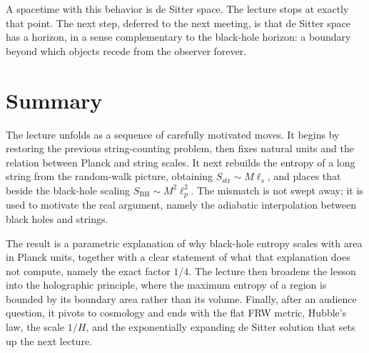 A spacetime with this behavior is de Sitter space. The lecture stops at exactly that point. The next step, deferred to the next meeting, is that de Sitter space has a horizon, in a sense complementary to the black-hole horizon: a boundary beyond which objects recede from the observer forever.

\section{Summary}

The lecture unfolds as a sequence of carefully motivated moves. It begins by restoring the previous string-counting problem, then fixes natural units and the relation between Planck and string scales. It next rebuilds the entropy of a long string from the random-walk picture, obtaining \(S_{\mathrm{str}} \sim M\ell_s\), and places that beside the black-hole scaling \(S_{\mathrm{BH}} \sim M^2\ell_p^2\). The mismatch is not swept away; it is used to motivate the real argument, namely the adiabatic interpolation between black holes and strings.

The result is a parametric explanation of why black-hole entropy scales with area in Planck units, together with a clear statement of what that explanation does not compute, namely the exact factor \(1/4\). The lecture then broadens the lesson into the holographic principle, where the maximum entropy of a region is bounded by its boundary area rather than its volume. Finally, after an audience question, it pivots to cosmology and ends with the flat FRW metric, Hubble's law, the scale \(1/H\), and the exponentially expanding de Sitter solution that sets up the next lecture.